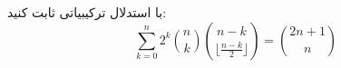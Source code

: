 \EXERCISE
با استدلال ترکیبیاتی ثابت کنید:
$$\sum_{k=0}^{n} 2^k \binom{n}{k} \binom{n-k}{\lfloor \frac{n-k}{2} \rfloor} = \binom{2n+1}{n}$$